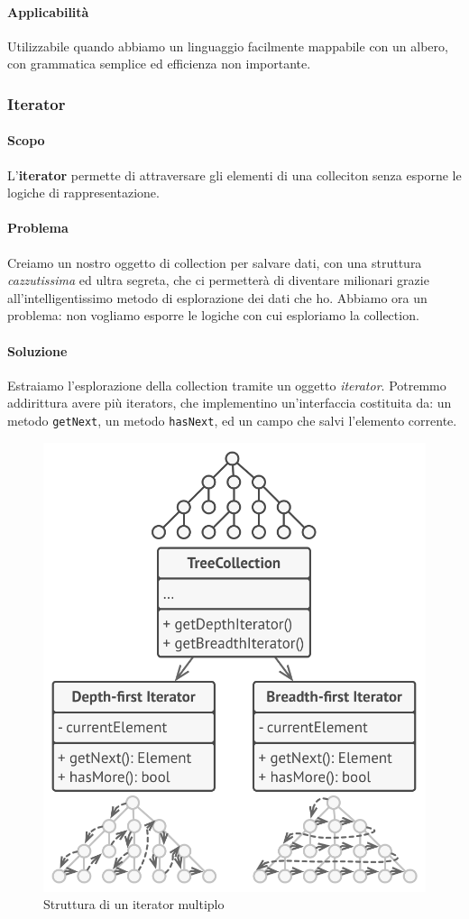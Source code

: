 \documentclass[11pt]{article}
\newcommand{\code}[1]{\texttt{#1}}
\begin{document}
\paragraph{Applicabilità}
Utilizzabile quando abbiamo un linguaggio facilmente mappabile con un albero, con grammatica semplice ed efficienza non importante.
\subsubsection{Iterator}
\paragraph{Scopo}
L'\textbf{iterator} permette di attraversare gli elementi di una colleciton senza esporne le logiche di rappresentazione.
\paragraph{Problema}
Creiamo un nostro oggetto di collection per salvare dati, con una struttura \textit{cazzutissima} ed ultra segreta, che ci permetterà di diventare milionari grazie all'intelligentissimo metodo di esplorazione dei dati che ho. Abbiamo ora un problema: non vogliamo esporre le logiche con cui esploriamo la collection. 
\paragraph{Soluzione}
Estraiamo l'esplorazione della collection tramite un oggetto \textit{iterator}. Potremmo addirittura avere più iterators, che implementino un'interfaccia costituita da: un metodo \code{getNext}, un metodo \code{hasNext}, ed un campo che salvi l'elemento corrente. 
\begin{figure}[H]
    \includegraphics[width=\linewidth]{res/teoria/Iterator.png}
    \caption{Struttura di un iterator multiplo}
\end{figure}
\end{document}
